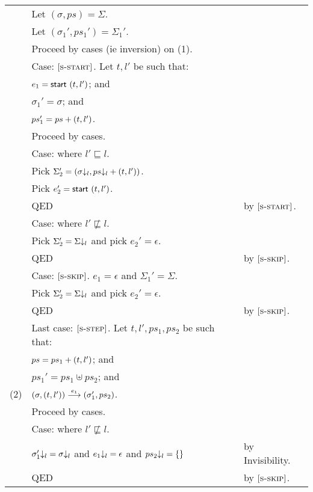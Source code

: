 \begin{tabular}{l@{$\qquad$}l@{$\qquad$}l}
        & Let $(\sigma, ps) = \Sigma$.
\\
        & Let $(\sigma_1', ps_1') = \Sigma_1'$.
\\
        & Proceed by cases (ie inversion) on (1).
\\
        & Case: $\rn{s-start}$. Let $t,l'$ be such that:
\\
        & \z $e_1=\evstart{\process{t}{l'}}$; and
\\
        & \z $\sigma_1'=\sigma$; and
\\
        & \z $ps_1'=ps+\process{t}{l'}$.
\\
        & \z Proceed by cases.
\\
        & \z Case: where $l'\sqsubseteq l$.
\\
        & \z \z Pick $\Sigma_2' = {(\proj{\sigma}{l},\proj{ps}{l}+\process{t}{l'})}$.
\\
        & \z \z Pick $e_2' = {\evstart{\process{t}{l'}}}$.
\\
        & \z \z QED
        & by  $\rn{s-start}$.
\\
       & \z Case: where $l'\not\sqsubseteq l$.
\\
        & \z \z Pick $\Sigma_2' = \proj{\Sigma}{l}$ and pick $e_2' = \epsilon$.
\\
        & \z \z QED
        & by  $\rn{s-skip}$.
\\
        & Case: $\rn{s-skip}$. $e_1=\epsilon$ and $\Sigma_1'=\Sigma$.
\\
        & \z Pick $\Sigma_2' = \proj{\Sigma}{l}$ and pick $e_2' = \epsilon$.
\\
        & \z QED
        & by  $\rn{s-skip}$.
\\
        & Last case: $\rn{s-step}$. Let $t,l',ps_1,ps_2$ be such that:
\\
        & $ps=ps_1+\process{t}{l'}$; and
\\
        & $ps_1'=ps_1\uplus ps_2$; and
\\
  (2)   & $\tstep{e_1}{(\sigma,\process{t}{l'})}{(\sigma_1',ps_2)}$.
\\
        & Proceed by cases.
\\
        & Case: where $l'\not\sqsubseteq l$.
\\
        & \z $\proj{\sigma_1'}{l}=\proj{\sigma}{l}$ and $\proj{e_1}{l}=\epsilon$ and $\proj{ps_2}{l}=\{\}$
        & by Invisibility.
\\
        & \z QED
        & by $\rn{s-skip}$.
\\

\end{tabular}
